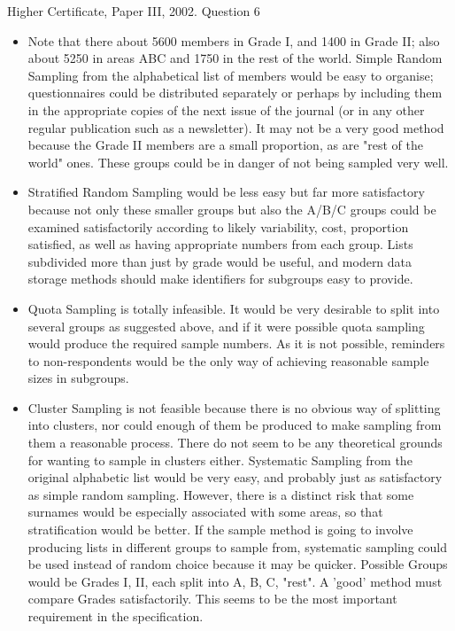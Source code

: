 \documentclass[a4paper,12pt]{article}
\begin{document}
Higher Certificate, Paper III, 2002. Question 6
\begin{itemize} 
\item Note that there about 5600 members in Grade I, and 1400 in Grade II; also about
5250 in areas ABC and 1750 in the rest of the world.
Simple Random Sampling from the alphabetical list of members would be easy to
organise; questionnaires could be distributed separately or perhaps by including them
in the appropriate copies of the next issue of the journal (or in any other regular
publication such as a newsletter). It may not be a very good method because the
Grade II members are a small proportion, as are "rest of the world" ones. These
groups could be in danger of not being sampled very well.
\item Stratified Random Sampling would be less easy but far more satisfactory because not
only these smaller groups but also the A/B/C groups could be examined satisfactorily
according to likely variability, cost, proportion satisfied, as well as having appropriate
numbers from each group. Lists subdivided more than just by grade would be useful,
and modern data storage methods should make identifiers for subgroups easy to
provide.
\item Quota Sampling is totally infeasible. It would be very desirable to split into several
groups as suggested above, and if it were possible quota sampling would produce the
required sample numbers. As it is not possible, reminders to non-respondents would
be the only way of achieving reasonable sample sizes in subgroups.
\item Cluster Sampling is not feasible because there is no obvious way of splitting into
clusters, nor could enough of them be produced to make sampling from them a
reasonable process. There do not seem to be any theoretical grounds for wanting to
sample in clusters either.
Systematic Sampling from the original alphabetic list would be very easy, and
probably just as satisfactory as simple random sampling. However, there is a distinct
risk that some surnames would be especially associated with some areas, so that
stratification would be better. If the sample method is going to involve producing
lists in different groups to sample from, systematic sampling could be used instead of
random choice because it may be quicker.
Possible Groups would be Grades I, II, each split into A, B, C, "rest". A 'good'
method must compare Grades satisfactorily. This seems to be the most important
requirement in the specification.

\end{itemize}
\end{document}
